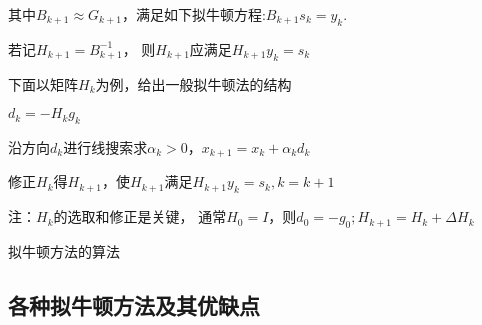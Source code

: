         其中$B_{k+1}\approx G_{k+1}$，满足如下拟牛顿方程:$B_{k+1}s_k=y_k$.
        
        若记$H_{k+1}=B_{k+1}^{-1}$，
        则$H_{k+1}$应满足$H_{k+1}y_k=s_k$
        
        下面以矩阵$H_k$为例，给出一般拟牛顿法的结构
            
            
        
            
            
               
        \begin{algorithm}
        
            \SetAlgoLined
        
             {
                $d_k=-H_kg_k$
                
                沿方向$d_k$进行线搜索求$\alpha_k>0$，$x_{k+1}=x_k+\alpha_kd_k$
                
                修正$H_k$得$H_{k+1}$，使$H_{k+1}$满足$H_{k+1}y_k=s_k,k=k+1$
            }
            
            注：$H_k$的选取和修正是关键，
            通常$H_0=I$，则$d_0=-g_0;H_{k+1}=H_k+\Delta H_k$
            \caption{拟牛顿方法的算法}
        \end{algorithm}
        
        \subsection{各种拟牛顿方法及其优缺点}
